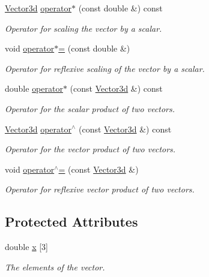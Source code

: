 \begin{DoxyCompactItemize}
\hyperlink{classVector3d}{Vector3d} \hyperlink{classVector3d_a656a4a90ae5619c4deb7851da2aaa2e8}{operator$\ast$} (const double \&) const 
\begin{DoxyCompactList}\small\item\em Operator for scaling the vector by a scalar. \end{DoxyCompactList}\item 
void \hyperlink{classVector3d_a3014b4a7a5feded758421dfb7df4daa2}{operator$\ast$=} (const double \&)
\begin{DoxyCompactList}\small\item\em Operator for reflexive scaling of the vector by a scalar. \end{DoxyCompactList}\item 
double \hyperlink{classVector3d_a43b3a3d87cedd5a88539d030a8853590}{operator$\ast$} (const \hyperlink{classVector3d}{Vector3d} \&) const 
\begin{DoxyCompactList}\small\item\em Operator for the scalar product of two vectors. \end{DoxyCompactList}\item 
\hyperlink{classVector3d}{Vector3d} \hyperlink{classVector3d_a3a8254737a895334fc887d98e8446298}{operator$^\wedge$} (const \hyperlink{classVector3d}{Vector3d} \&) const 
\begin{DoxyCompactList}\small\item\em Operator for the vector product of two vectors. \end{DoxyCompactList}\item 
void \hyperlink{classVector3d_a868e89192951f4a25f63b958ec419f6f}{operator$^\wedge$=} (const \hyperlink{classVector3d}{Vector3d} \&)
\begin{DoxyCompactList}\small\item\em Operator for reflexive vector product of two vectors. \end{DoxyCompactList}\end{DoxyCompactItemize}
\subsection*{Protected Attributes}
\begin{DoxyCompactItemize}
\item 
double \hyperlink{classVector3d_ae5e82a2be7cc2e195e56875a5befe509}{x} \mbox{[}3\mbox{]}
\begin{DoxyCompactList}\small\item\em The elements of the vector. \end{DoxyCompactList}\end{DoxyCompactItemize}


